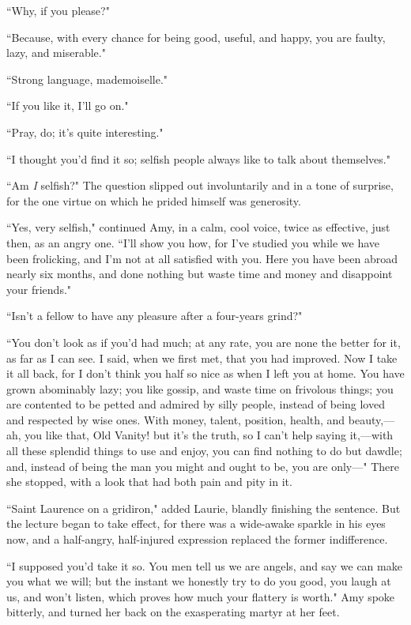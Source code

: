 ``Why, if you please?"

``Because, with every chance for being good, useful, and happy, you are
faulty, lazy, and miserable."

``Strong language, mademoiselle."

``If you like it, I'll go on."

``Pray, do; it's quite interesting."

``I thought you'd find it so; selfish people always like
to talk about themselves."

``Am \emph{I} selfish?" The question slipped out involuntarily and in a
tone of surprise, for the one virtue on which he prided himself was
generosity.

``Yes, very selfish," continued Amy, in a calm, cool voice, twice as
effective, just then, as an angry one. ``I'll show you
how, for I've studied you while we have been frolicking,
and I'm not at all satisfied with you. Here you have
been abroad nearly six months, and done nothing but waste time and money
and disappoint your friends."

``Isn't a fellow to have any pleasure after a four-years
grind?"

``You don't look as if you'd had much; at
any rate, you are none the better for it, as far as I can see. I said,
when we first met, that you had improved. Now I take it all back, for I
don't think you half so nice as when I left you at home.
You have grown abominably lazy; you like gossip, and waste time on
frivolous things; you are contented to be petted and admired by silly
people, instead of being loved and respected by wise ones. With money,
talent, position, health, and beauty,---ah, you like that, Old Vanity!
but it's the truth, so I can't help
saying it,---with all these splendid things to use and enjoy, you can
find nothing to do but dawdle; and, instead of being the man you might
and ought to be, you are only---" There she stopped, with a look that
had both pain and pity in it.

``Saint Laurence on a gridiron," added Laurie, blandly finishing the
sentence. But the lecture began to take effect, for there was a
wide-awake sparkle in his eyes now, and a half-angry, half-injured
expression replaced the former indifference.

``I supposed you'd take it so. You men tell us we are
angels, and say we can make you what we will; but the instant we
honestly try to do you good, you laugh at us, and won't
listen, which proves how much your flattery is worth." Amy spoke
bitterly, and turned her back on the exasperating martyr at her feet.

